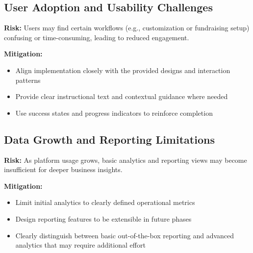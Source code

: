 \subsection{User Adoption and Usability Challenges}

\textbf{Risk:}  
Users may find certain workflows (e.g., customization or fundraising setup)
confusing or time-consuming, leading to reduced engagement.

\textbf{Mitigation:}
\begin{itemize}[leftmargin=1.5em]
    \item Align implementation closely with the provided designs and interaction
    patterns
    \item Provide clear instructional text and contextual guidance where needed
    \item Use success states and progress indicators to reinforce completion
\end{itemize}

\subsection{Data Growth and Reporting Limitations}

\textbf{Risk:}  
As platform usage grows, basic analytics and reporting views may become
insufficient for deeper business insights.

\textbf{Mitigation:}
\begin{itemize}[leftmargin=1.5em]
    \item Limit initial analytics to clearly defined operational metrics
    \item Design reporting features to be extensible in future phases
    \item Clearly distinguish between basic out-of-the-box reporting and advanced
    analytics that may require additional effort
\end{itemize}
